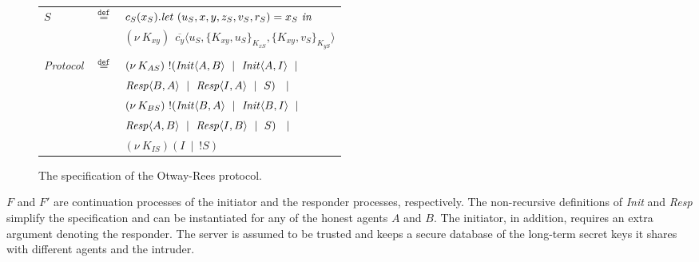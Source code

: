 \documentclass[10pt,a4paper,final,oneside,fleqn]{book}
\newcommand*{\eqdef}{\mathbin{\mathop{=}\limits^{\texttt{def}}}}
\begin{document}
\begin{figure}[!tbp]
\begin{center}
\begin{tabular}{|lll|}
$S$&$\eqdef$&$c_S(x_{S}).\mbox{{\itshape let\/} }(u_{S},x,y,z_{S},v_{S},r_{S})=x_{S}\mbox{ {\itshape in\/}}$\\
&&$(\nu~\! K_{xy})~~\overline{c_{y}}\langle u_{S},\{K_{xy},u_{S}\}_{K_{xS}},\{K_{xy},v_{S}\}_{K_{yS}}\rangle$\\&&\\
{\itshape Protocol\/}&$\eqdef$&$(\nu~\!K_{AS})~!(\mbox{{\itshape Init\/}}\langle A,B\rangle~\mid~\mbox{{\itshape Init\/}}\langle A,I\rangle~\mid$\\
&&\hspace{16mm}$\mbox{{\itshape Resp\/}}\langle B,A\rangle~\mid~\mbox{{\itshape Resp\/}}\langle I,A\rangle~\mid~S)~~\mid$\\
&&$(\nu~\!K_{BS})~!(\mbox{{\itshape Init\/}}\langle B,A\rangle~\mid~\mbox{{\itshape Init\/}}\langle B,I\rangle~\mid$\\
&&\hspace{16mm}$\mbox{{\itshape Resp\/}}\langle A,B\rangle~\mid~\mbox{{\itshape Resp\/}}\langle I,B\rangle~\mid~S)~~\mid$\\
&&$(\nu~\!K_{IS})(I~\mid~!S)$\\
\hline
\end{tabular}
\end{center}
\caption{The specification of the Otway-Rees protocol.\label{ot}}
\end{figure}
$F$ and $F'$ are continuation processes of the initiator and the responder processes, respectively.  The non-recursive definitions of {\itshape Init\/} and {\itshape Resp\/} simplify the specification and can be instantiated for any of the honest agents $A$ and $B$. The initiator, in addition, requires an extra argument denoting the responder.  The server is assumed to be trusted and keeps a secure database of the long-term secret keys it shares with different agents and the intruder.
\end{document}

